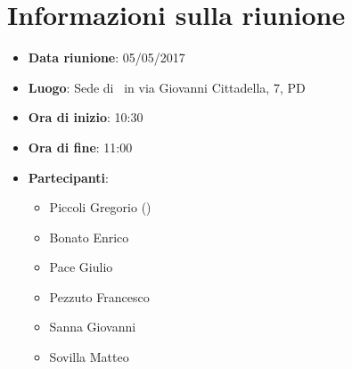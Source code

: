 \documentclass[../AnalisiDeiRequisiti.tex]{subfiles}
\begin{document}
	\section*{Informazioni sulla riunione}
		\begin{itemize}
			\item \textbf{Data riunione}: 05/05/2017
			\item \textbf{Luogo}: Sede di \proponente\ in via Giovanni Cittadella, 7, PD
			\item \textbf{Ora di inizio}: 10:30
			\item \textbf{Ora di fine}: 11:00
			\item \textbf{Partecipanti}:
				\begin{itemize}
					\item Piccoli Gregorio (\proponente)
					\item Bonato Enrico
					\item Pace Giulio
					\item Pezzuto Francesco
					\item Sanna Giovanni
					\item Sovilla Matteo
				\end{itemize}
		\end{itemize}
\end{document}
